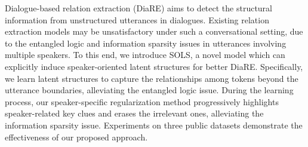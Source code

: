 Dialogue-based relation extraction (DiaRE) aims to detect the structural information from unstructured utterances in dialogues. Existing relation extraction models may be unsatisfactory under such a conversational setting, due to the entangled logic and information sparsity issues in utterances involving multiple speakers. To this end, we introduce SOLS, a novel model which can explicitly induce speaker-oriented latent structures for better DiaRE. Specifically, we learn latent structures to capture the relationships among tokens beyond the utterance boundaries, alleviating the entangled logic issue. During the learning process, our speaker-specific regularization method progressively highlights speaker-related key clues and erases the irrelevant ones, alleviating the information sparsity issue. Experiments on three public datasets demonstrate the effectiveness of our proposed approach.
